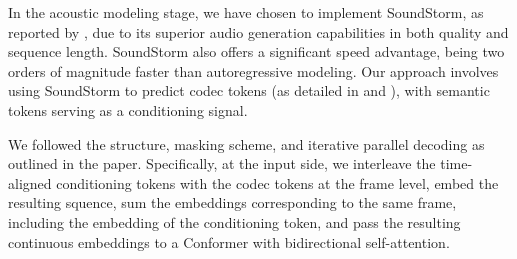 

In the acoustic modeling stage, we have chosen to implement SoundStorm, as reported by \citep{borsos2023soundstorm}, due to its superior audio generation capabilities in both quality and sequence length. SoundStorm also offers a significant speed advantage, being two orders of magnitude faster than autoregressive modeling. Our approach involves using SoundStorm to predict codec tokens (as detailed in \citep{défossez2022high} and \citep{zeghidour2021soundstream}), with semantic tokens serving as a conditioning signal.

We followed the structure, masking scheme, and iterative parallel decoding as outlined in the \citep{borsos2023soundstorm} paper. Specifically, at the input side, we interleave the time-aligned conditioning tokens with the codec tokens at the frame level, embed the resulting squence, sum the embeddings corresponding to the same frame, including the embedding of the conditioning token, and pass the resulting continuous embeddings to a Conformer with bidirectional self-attention.
